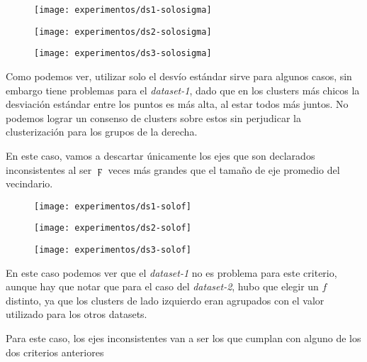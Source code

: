 \begin{figure}[H]
	\centering
	\begin{minipage}[t]{.3\textwidth}
		\centering
		\texttt{[image: experimentos/ds1-solosigma]}
	\end{minipage}\qquad
	\begin{minipage}[t]{.3\textwidth}
		\centering
		\texttt{[image: experimentos/ds2-solosigma]}
	\end{minipage}\qquad
	\begin{minipage}[t]{.3\textwidth}
		\centering
		\texttt{[image: experimentos/ds3-solosigma]}
	\end{minipage}
\end{figure}	

Como podemos ver, utilizar solo el desvío estándar sirve para algunos casos, sin embargo tiene problemas para el \textit{dataset-1}, dado que en los clusters más chicos la desviación estándar entre los puntos es más alta, al estar todos más juntos. No podemos lograr un consenso de clusters sobre estos sin perjudicar la clusterización para los grupos de la derecha.


En este caso, vamos a descartar únicamente los ejes que son declarados inconsistentes al ser $\digamma$ veces más grandes que el tamaño de eje promedio del vecindario.


\begin{figure}[H]
	\centering
	\begin{minipage}[t]{.3\textwidth}
		\centering
		\texttt{[image: experimentos/ds1-solof]}
	\end{minipage}\qquad
	\begin{minipage}[t]{.3\textwidth}
		\centering
		\texttt{[image: experimentos/ds2-solof]}
	\end{minipage}\qquad
	\begin{minipage}[t]{.3\textwidth}
		\centering
		\texttt{[image: experimentos/ds3-solof]}
	\end{minipage}
\end{figure}

En este caso podemos ver que el \textit{dataset-1} no es problema para este criterio, aunque hay que notar que para el caso del \textit{dataset-2}, hubo que elegir un $f$ distinto, ya que los clusters de lado izquierdo eran agrupados con el valor utilizado para los otros datasets.

Para este caso, los ejes inconsistentes van a ser los que cumplan con alguno de los dos criterios anteriores


